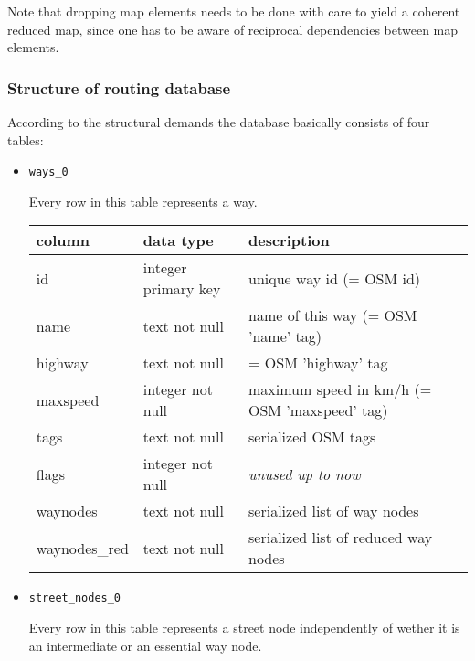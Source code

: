 Note that dropping map elements needs to be done with care to yield a coherent reduced map, since one has to be aware of reciprocal   dependencies between map elements.

\subsubsection{Structure of routing database}

According to the structural demands the database basically consists of four tables:

\begin{itemize}

	\item \texttt{ways\_0}		
						
		Every row in this table represents a way.\newline

		\begin{tabular}[ht]{|p{2.5cm}|p{3.5cm}|p{8.5cm}|}
			\hline
			column & data type & description \\
			\hline\hline
			 id & integer primary key & unique way id (= OSM id)\\
			 name & text not null & name of this way (= OSM 'name' tag)\\	
			 highway & text not null & = OSM 'highway' tag\\
			 maxspeed & integer not null & maximum speed in km/h (= OSM 'maxspeed' tag)\\			 
			 tags & text not null & serialized OSM tags\\
			 flags & integer not null & \emph{unused up to now}\\				 
			 waynodes & text not null & serialized list of way nodes\\
			 waynodes\_red & text not null & serialized list of reduced way nodes\\
			\hline
		\end{tabular}\newline

	
	\item \texttt{street\_nodes\_0}

		Every row in this table represents a street node independently of wether it is an intermediate or an essential way node.\newline


\end{itemize}
